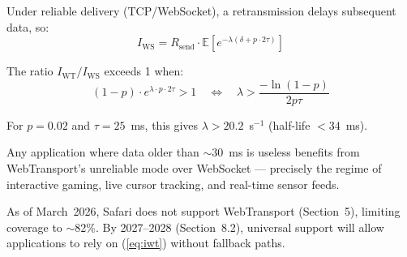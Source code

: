 Under reliable delivery (TCP/WebSocket), a retransmission delays
subsequent data, so:
\begin{equation}
  I_{\text{WS}} = R_{\text{send}}
    \cdot \mathbb{E}\!\left[e^{-\lambda(\delta + p \cdot 2\tau)}\right]
  \label{eq:iws}
\end{equation}

The ratio $I_{\text{WT}} / I_{\text{WS}}$ exceeds 1 when:
\begin{equation}
  (1 - p) \cdot e^{\lambda \cdot p \cdot 2\tau} > 1
  \quad \Longleftrightarrow \quad
  \lambda > \frac{-\ln(1 - p)}{2 p \tau}
  \label{eq:wt-advantage}
\end{equation}

For $p = 0.02$ and $\tau = 25$~ms, this gives $\lambda > 20.2$~s$^{-1}$
(half-life $< 34$~ms).


Any application where data older than
$\sim$30~ms is useless benefits from WebTransport's unreliable
mode over WebSocket --- precisely the regime of interactive gaming, live
cursor tracking, and real-time sensor feeds.

As of March~2026, Safari does not support WebTransport
(Section~5), limiting coverage to $\sim$82\%. By 2027--2028
(Section~8.2), universal support will allow applications to rely on
(\ref{eq:iwt}) without fallback paths.

